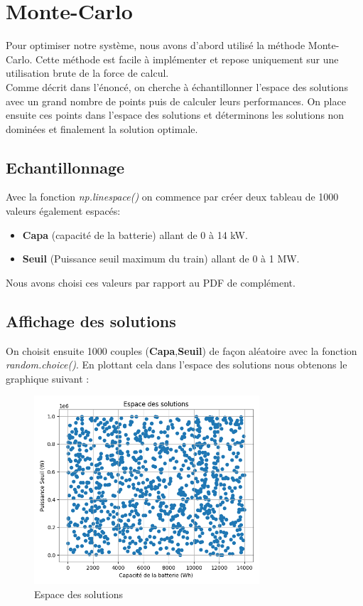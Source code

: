 \documentclass[11pt, a4paper, oneside, portrait]{report}
\begin{document}
    \section*{Monte-Carlo}
        Pour optimiser notre système, nous avons d'abord utilisé la méthode Monte-Carlo. Cette méthode est facile à implémenter et repose uniquement sur une      utilisation brute de la force de calcul.\\
        
        Comme décrit dans l'énoncé, on cherche à échantillonner l’espace des solutions avec un grand nombre de points puis de calculer leurs performances. On place ensuite ces points dans l'espace des solutions et déterminons les solutions non dominées et finalement la solution optimale.

        \subsection*{Echantillonnage}
            Avec la fonction \textit{np.linespace()} on commence par créer deux tableau de 1000 valeurs également espacés: 
            \begin{itemize}
                \item \textbf{Capa} (capacité de la batterie) allant de 0 à 14 kW.
                \item \textbf{Seuil} (Puissance seuil maximum du train) allant de 0 à 1 MW.
            \end{itemize}
            
            Nous avons choisi ces valeurs par rapport au PDF de complément.

        \subsection*{Affichage des solutions}
            On choisit ensuite 1000 couples (\textbf{Capa},\textbf{Seuil}) de façon aléatoire avec la fonction \textit{random.choice()}. En plottant cela dans l'espace des solutions nous obtenons le graphique suivant : 

            \begin{figure}[H]
                \centering
                \includegraphics[height=7cm]{espace_solution.png}
                \caption{Espace des solutions}
            \end{figure}
\end{document}

